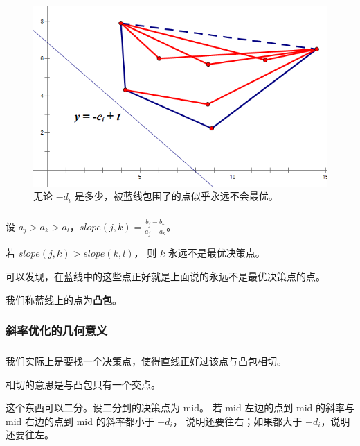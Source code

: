 \documentclass[9pt, UTF8]{beamer} %
\newcommand \fts {\frametitle{\insertsubsection}}
\newcommand \ftss {\frametitle{\insertsubsubsection}}
\newcommand \bpause { \bigskip \pause }
\begin{document}
	\begin{frame}
		\fts

		\begin{figure}
			\centering
			\includegraphics[scale=0.35]{pic/pic8.png}
			\caption{无论 $-d_i$ 是多少，被蓝线包围了的点似乎永远不会最优。}
		\end{figure}
	\end{frame}

	\begin{frame}
		\fts

		\begin{theorem}
			设 $a_j > a_k > a_l$，$slope(j, k) = \frac {b_j - b_k} {a_j - a_k}$。

			若 $slope(j, k) > slope(k, l)$，
			则 $k$ 永远不是最优决策点。
		\end{theorem}

		可以发现，在蓝线中的这些点正好就是上面说的永远不是最优决策点的点。

		\bpause

		我们称蓝线上的点为\textbf{\uline{凸包}}。
	\end{frame}

	\subsubsection{斜率优化的几何意义}

	\begin{frame}
		\ftss

		我们实际上是要找一个决策点，使得直线正好过该点与凸包相切。

		相切的意思是与凸包只有一个交点。

		\bpause

		这个东西可以二分。设二分到的决策点为 mid。
		若 mid 左边的点到 mid 的斜率与 mid 右边的点到 mid 的斜率都小于 $-d_i$，
		说明还要往右；如果都大于 $-d_i$，说明还要往左。
	\end{frame}
\end{document}
